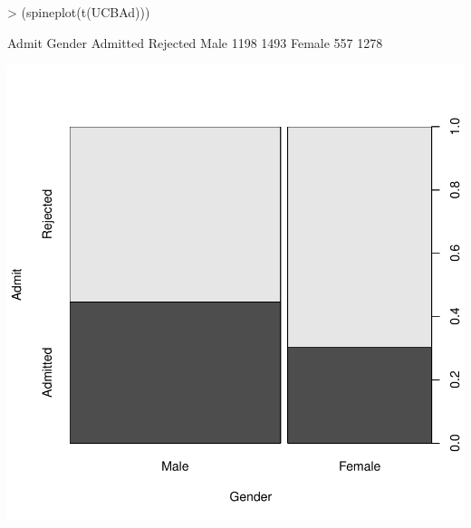 \documentclass[12pt,letterpaper,final]{article}
\begin{document}
\begin{Schunk}
\begin{Sinput}
> (spineplot(t(UCBAd)))
\end{Sinput}
\begin{Soutput}
        Admit
Gender   Admitted Rejected
  Male       1198     1493
  Female      557     1278
\end{Soutput}
\end{Schunk}
\includegraphics{lect_main-049}
\end{document}
